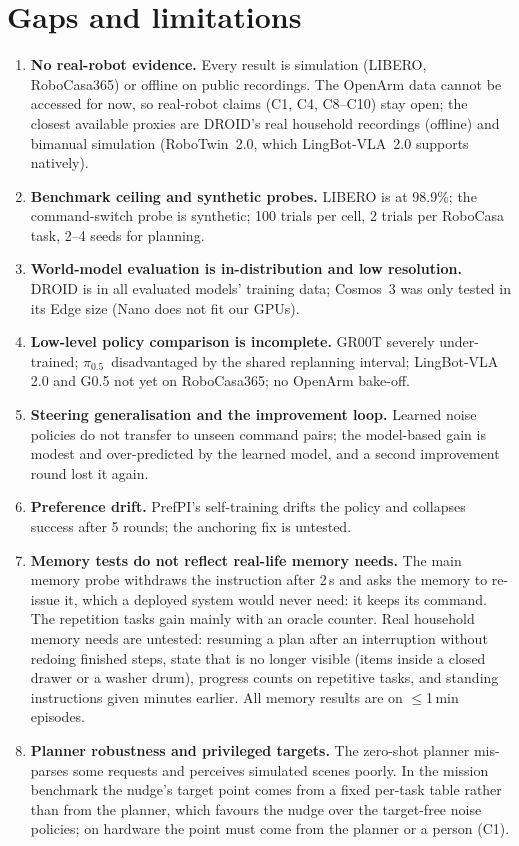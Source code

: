 \documentclass[10pt,a4paper]{article}
\newcommand{\pzf}{$\pi_{0.5}$}
\begin{document}
\section{Gaps and limitations}
\label{sec:gaps}
\begin{enumerate}
\item \textbf{No real-robot evidence.} Every result is simulation (LIBERO, RoboCasa365) or offline on public recordings. The OpenArm data cannot be accessed for now, so real-robot claims (C1, C4, C8--C10) stay open; the closest available proxies are DROID's real household recordings (offline) and bimanual simulation (RoboTwin~2.0, which LingBot-VLA~2.0 supports natively).
\item \textbf{Benchmark ceiling and synthetic probes.} LIBERO is at 98.9\%; the command-switch probe is synthetic; 100 trials per cell, 2 trials per RoboCasa task, 2--4 seeds for planning.
\item \textbf{World-model evaluation is in-distribution and low resolution.} DROID is in all evaluated models' training data; Cosmos~3 was only tested in its Edge size (Nano does not fit our GPUs).
\item \textbf{Low-level policy comparison is incomplete.} GR00T severely under-trained; \pzf\ disadvantaged by the shared replanning interval; LingBot-VLA 2.0 and G0.5 not yet on RoboCasa365; no OpenArm bake-off.
\item \textbf{Steering generalisation and the improvement loop.} Learned noise policies do not transfer to unseen command pairs; the model-based gain is modest and over-predicted by the learned model, and a second improvement round lost it again.
\item \textbf{Preference drift.} PrefPI's self-training drifts the policy and collapses success after 5 rounds; the anchoring fix is untested.
\item \textbf{Memory tests do not reflect real-life memory needs.} The main memory probe withdraws the instruction after 2\,s and asks the memory to re-issue it, which a deployed system would never need: it keeps its command. The repetition tasks gain mainly with an oracle counter. Real household memory needs are untested: resuming a plan after an interruption without redoing finished steps, state that is no longer visible (items inside a closed drawer or a washer drum), progress counts on repetitive tasks, and standing instructions given minutes earlier. All memory results are on $\le$1\,min episodes.
\item \textbf{Planner robustness and privileged targets.} The zero-shot planner mis-parses some requests and perceives simulated scenes poorly. In the mission benchmark the nudge's target point comes from a fixed per-task table rather than from the planner, which favours the nudge over the target-free noise policies; on hardware the point must come from the planner or a person (C1).

\end{enumerate}
\end{document}
